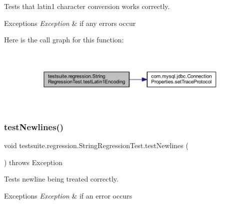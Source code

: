 Tests that \textquotesingle{}latin1\textquotesingle{} character conversion works correctly.


\begin{DoxyExceptions}{Exceptions}
{\em Exception} & if any errors occur \\
\hline
\end{DoxyExceptions}
Here is the call graph for this function\+:
\nopagebreak
\begin{figure}[H]
\begin{center}
\leavevmode
\includegraphics[width=350pt]{classtestsuite_1_1regression_1_1_string_regression_test_abcc37c5fb4c57b3f201afaadbc55ee13_cgraph}
\end{center}
\end{figure}
\mbox{\label{classtestsuite_1_1regression_1_1_string_regression_test_a5e1296ac09b9d40f0116a776de542e0a}} 
\subsubsection{\texorpdfstring{test\+Newlines()}{testNewlines()}}
{\footnotesize\ttfamily void testsuite.\+regression.\+String\+Regression\+Test.\+test\+Newlines (\begin{DoxyParamCaption}{ }\end{DoxyParamCaption}) throws Exception}

Tests newline being treated correctly.


\begin{DoxyExceptions}{Exceptions}
{\em Exception} & if an error occurs \\
\hline
\end{DoxyExceptions}
\mbox{\label{classtestsuite_1_1regression_1_1_string_regression_test_a79556638c7ab71bef596c339006c2e19}} 
